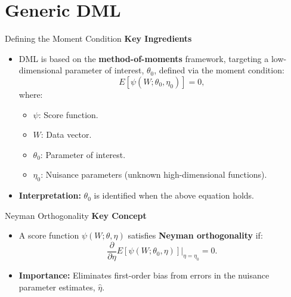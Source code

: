 \documentclass[xcolor=svgnames,t]{beamer}
\begin{document}
           \section{Generic DML}         
                    \begin{frame}{Defining the Moment Condition}
                        \textbf{Key Ingredients}
                        \begin{itemize}
                            \item DML is based on the \textbf{method-of-moments} framework, targeting a low-dimensional parameter of interest, \(\theta_0\), defined via the moment condition:
                            \[
                            E[\psi(W; \theta_0, \eta_0)] = 0,
                            \]
                            where:
                            \begin{itemize}
                                \item \(\psi\): Score function.
                                \item \(W\): Data vector.
                                \item \(\theta_0\): Parameter of interest.
                                \item \(\eta_0\): Nuisance parameters (unknown high-dimensional functions).
                            \end{itemize}
                            \pause
                            \item \textbf{Interpretation:} \(\theta_0\) is identified when the above equation holds.
                        \end{itemize}
                        \end{frame}
                        
                        \begin{frame}{Neyman Orthogonality}
                        \textbf{Key Concept}
                        \begin{itemize}
                            \item A score function \(\psi(W; \theta, \eta)\) satisfies \textbf{Neyman orthogonality} if:
                            \[
                            \frac{\partial}{\partial \eta} E[\psi(W; \theta_0, \eta)]\bigg|_{\eta=\eta_0} = 0.
                            \]
                            \pause
                            \item \textbf{Importance:} Eliminates first-order bias from errors in the nuisance parameter estimates, \(\hat{\eta}\).
                        \end{itemize}
                       
                        \end{frame}
                        
\end{document}
